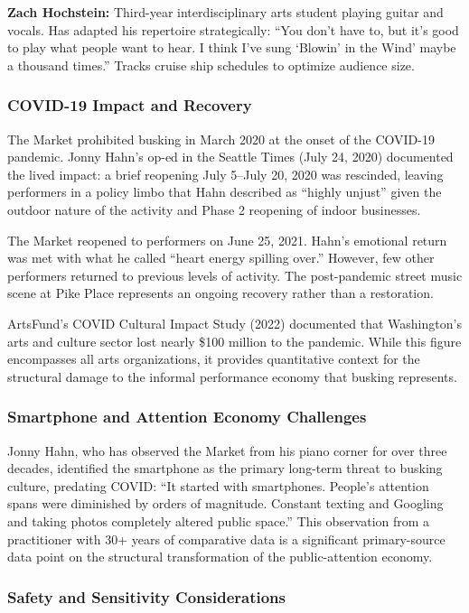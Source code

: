 \documentclass[11pt,letterpaper]{article}
\begin{document}
\textbf{Zach Hochstein:} Third-year interdisciplinary arts student playing guitar and vocals. Has adapted his repertoire strategically: ``You don't have to, but it's good to play what people want to hear. I think I've sung `Blowin' in the Wind' maybe a thousand times.'' Tracks cruise ship schedules to optimize audience size.

\subsubsection{COVID-19 Impact and Recovery}

The Market prohibited busking in March 2020 at the onset of the COVID-19 pandemic. Jonny Hahn's op-ed in the Seattle Times (July 24, 2020) documented the lived impact: a brief reopening July 5--July 20, 2020 was rescinded, leaving performers in a policy limbo that Hahn described as ``highly unjust'' given the outdoor nature of the activity and Phase 2 reopening of indoor businesses.

The Market reopened to performers on June 25, 2021. Hahn's emotional return was met with what he called ``heart energy spilling over.'' However, few other performers returned to previous levels of activity. The post-pandemic street music scene at Pike Place represents an ongoing recovery rather than a restoration.

ArtsFund's COVID Cultural Impact Study (2022) documented that Washington's arts and culture sector lost nearly \$100 million to the pandemic. While this figure encompasses all arts organizations, it provides quantitative context for the structural damage to the informal performance economy that busking represents.

\subsubsection{Smartphone and Attention Economy Challenges}

Jonny Hahn, who has observed the Market from his piano corner for over three decades, identified the smartphone as the primary long-term threat to busking culture, predating COVID: ``It started with smartphones. People's attention spans were diminished by orders of magnitude. Constant texting and Googling and taking photos completely altered public space.'' This observation from a practitioner with 30+ years of comparative data is a significant primary-source data point on the structural transformation of the public-attention economy.

\subsubsection{Safety and Sensitivity Considerations}
\end{document}

